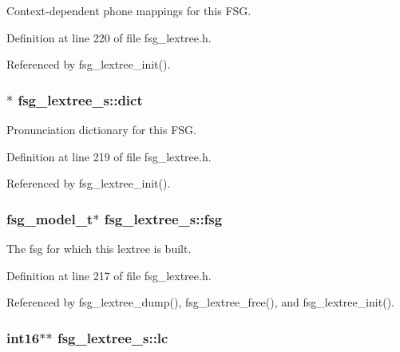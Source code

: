 Context-\/dependent phone mappings for this F\-S\-G. 



Definition at line 220 of file fsg\-\_\-lextree.\-h.



Referenced by fsg\-\_\-lextree\-\_\-init().

\subsubsection[{dict}]{$\ast$ fsg\-\_\-lextree\-\_\-s\-::dict}\label{structfsg__lextree__s_abf077af1c0dd1246b2032b917bfacba5}


Pronunciation dictionary for this F\-S\-G. 



Definition at line 219 of file fsg\-\_\-lextree.\-h.



Referenced by fsg\-\_\-lextree\-\_\-init().

\subsubsection[{fsg}]{\setlength{\rightskip}{0pt plus 5cm}fsg\-\_\-model\-\_\-t$\ast$ fsg\-\_\-lextree\-\_\-s\-::fsg}\label{structfsg__lextree__s_a161ff35c65373388f18e51236bf7ef5f}


The fsg for which this lextree is built. 



Definition at line 217 of file fsg\-\_\-lextree.\-h.



Referenced by fsg\-\_\-lextree\-\_\-dump(), fsg\-\_\-lextree\-\_\-free(), and fsg\-\_\-lextree\-\_\-init().

\subsubsection[{lc}]{\setlength{\rightskip}{0pt plus 5cm}int16$\ast$$\ast$ fsg\-\_\-lextree\-\_\-s\-::lc}\label{structfsg__lextree__s_a0655f40ec98c9d971aba1fa8a894575d}


